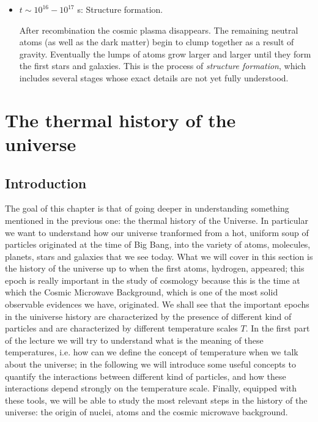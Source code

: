 \documentclass[11pt, a4paper,oneside,openright]{book}
\numberwithin{equation}{section}
\begin{document}
\begin{itemize}
\item $t\sim 10^{16}-10^{17}$ s: Structure formation.

After recombination the cosmic plasma disappears. The remaining neutral atoms (as well as the dark matter) begin to clump together as a result of gravity. Eventually the lumps of atoms grow larger and larger until they form the first stars and galaxies. This is the process of {\it structure formation}, which includes several stages whose exact details are not yet fully understood.

\end{itemize}


\chapter{The thermal history of the universe}

\section{Introduction}
The goal of this chapter is that of going deeper in understanding something mentioned in the previous one: the thermal history of the Universe. In particular we want to understand how our universe tranformed from a hot, uniform soup of particles originated at the time of Big Bang, into the variety of atoms, molecules, planets, stars and galaxies that we see today. What we will cover in this section is the history of the universe up to when the first atoms, hydrogen, appeared; this epoch is really important in the study of cosmology because this is the time at which the Cosmic Microwave Background, which is one of the most solid observable evidences we have, originated. We shall see that the important epochs in the uiniverse history are characterized by the presence of different kind of particles and are characterized by different temperature scales $T$. In the first part of the lecture we will try to understand what is the meaning of these temperatures, i.e. how can we define the concept of temperature when 
we talk about the universe; in the following we will introduce some useful concepts to quantify the interactions between different kind of particles, and how these interactions depend strongly on the temperature scale. Finally, equipped with these tools, we will be able to study the most relevant steps in the history of the universe: the origin of nuclei, atoms and the cosmic microwave background. 
\end{document}
